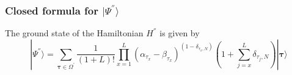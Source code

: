 \documentclass[10pt]{article}
\numberwithin{equation}{section}
\numberwithin{equation}{subsection}
\begin{document}
\subsubsection{Closed formula for $|\Psi^{''}\rangle$}\label{subsectionSSHsec}
\begin{comment}
\textbf{Notation}: sometimes, in the following, we will denote differently the configuration of this hard-core chain. Each configuration can be written as
\begin{equation}\label{Tau-Notation}
	|\bm{\tau}\rangle=|\tau_{1},\ldots,\tau_{L}\rangle =\begin{pmatrix}
		\tau_{1}\\
		\vdots\\
		\tau_{L}
	\end{pmatrix}
\end{equation} 
with $\tau_{x}\in \{1,\ldots,N\}$, $\forall x\in \{1,\ldots,L\}$. The notation with $\bm{n}$, introduced in Section~\ref{subsectionGeneratorStr} and the one with $\bm{\tau}$ are related by 
\begin{equation}
	n_{a}^{x}=\delta_{\tau_{x},a}
\end{equation}
\end{comment}
\begin{comment}

This notation is equivalent to the one introduced. Indeed, assume that at site $x$ we have a particle of type $a\in\{1,\ldots,N\} $, then $|n^{x}\rangle$ is composed by zeros but in the component $n_{a}^{x}$ where there is $1$. Therefore, we can uniquely associate  $\tau_{x}=a$ to this $|n^{x}\rangle$, denoting the presence of the species $a$ at site $x$. With this notation, we have that 
\begin{equation}\label{notation}
	|n^{x}\rangle =|\tau_{x}\rangle \qquad \text{and}\qquad|\bm{n}\rangle=|\bm{\tau}\rangle
\end{equation}
with the meaning explained above. It will be useful to introduce also $\bm{\tau}=(\tau_{x})_{x\in \{1,\ldots,L\}}$.
\end{comment} 
The ground state of the Hamiltonian $H^{''}$ is given by 
\begin{equation}\label{ResulsBasis}
	|\Psi^{''} \rangle= \sum_{\bm{\tau}\in \Omega^{'}}\frac{1}{\left(1+L\right)!}\prod_{x=1}^{L} (\alpha_{\tau_{x}}-\beta_{\tau_{x}})^{(1-\delta_{\tau_{x},N})}\left(1+\sum_{j=x}^{L}\delta_{\tau_{j},N}\right) |\bm{\tau}\rangle
\end{equation}
\end{document}
